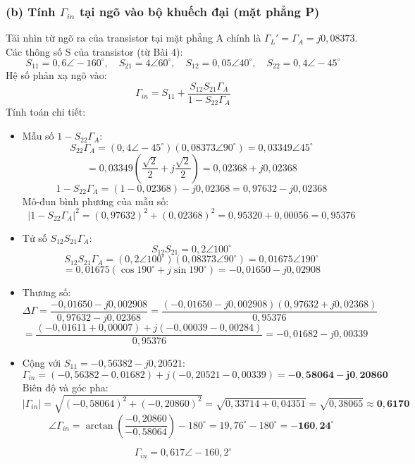\documentclass[12pt,a4paper]{article}
\begin{document}
\subsubsection{(b) Tính $\Gamma_{in}$ tại ngõ vào bộ khuếch đại (mặt phẳng P)}
Tải nhìn từ ngõ ra của transistor tại mặt phẳng A chính là $\Gamma_L' = \Gamma_A = j 0{,}08373$.
Các thông số S của transistor (từ Bài 4):
\[
S_{11} = 0{,}6\angle -160^\circ, \quad S_{21} = 4\angle 60^\circ, \quad S_{12} = 0{,}05\angle 40^\circ, \quad S_{22} = 0{,}4\angle -45^\circ
\]
Hệ số phản xạ ngõ vào:
\[
\Gamma_{in} = S_{11} + \frac{S_{12}S_{21}\Gamma_A}{1 - S_{22}\Gamma_A}
\]
Tính toán chi tiết:
\begin{itemize}
    \item Mẫu số $1 - S_{22}\Gamma_A$:
    \[
    S_{22}\Gamma_A = (0{,}4\angle -45^\circ)(0{,}08373\angle 90^\circ) = 0{,}03349 \angle 45^\circ
    \]
    \[
    = 0{,}03349\left(\frac{\sqrt{2}}{2} + j\frac{\sqrt{2}}{2}\right) = 0{,}02368 + j0{,}02368
    \]
    \[
    1 - S_{22}\Gamma_A = (1 - 0{,}02368) - j0{,}02368 = 0{,}97632 - j0{,}02368
    \]
    Mô-đun bình phương của mẫu số:
    \[
    |1 - S_{22}\Gamma_A|^2 = (0{,}97632)^2 + (0{,}02368)^2 = 0{,}95320 + 0{,}00056 = 0{,}95376
    \]
    \item Tử số $S_{12}S_{21}\Gamma_A$:
    \[
    S_{12}S_{21} = 0{,}2 \angle 100^\circ
    \]
    \[
    S_{12}S_{21}\Gamma_A = (0{,}2\angle 100^\circ)(0{,}08373\angle 90^\circ) = 0{,}01675 \angle 190^\circ
    \]
    \[
    = 0{,}01675(\cos 190^\circ + j\sin 190^\circ) = -0{,}01650 - j0{,}02908
    \]
    \item Thương số:
    \[
    \Delta \Gamma = \frac{-0{,}01650 - j0{,}002908}{0{,}97632 - j0{,}02368} = \frac{(-0{,}01650 - j0{,}002908)(0{,}97632 + j0{,}02368)}{0{,}95376}
    \]
    \[
    = \frac{(-0{,}01611 + 0{,}00007) + j(-0{,}00039 - 0{,}00284)}{0{,}95376} = -0{,}01682 - j0{,}00339
    \]
    \item Cộng với $S_{11} = -0{,}56382 - j0{,}20521$:
    \[
    \Gamma_{in} = (-0{,}56382 - 0{,}01682) + j(-0{,}20521 - 0{,}00339) = \mathbf{-0{,}58064 - j0{,}20860}
    \]
    Biên độ và góc pha:
    \[
    |\Gamma_{in}| = \sqrt{(-0{,}58064)^2 + (-0{,}20860)^2} = \sqrt{0{,}33714 + 0{,}04351} = \sqrt{0{,}38065} \approx \mathbf{0{,}6170}
    \]
    \[
    \angle \Gamma_{in} = \arctan\left(\frac{-0{,}20860}{-0{,}58064}\right) - 180^\circ = 19{,}76^\circ - 180^\circ = \mathbf{-160{,}24^\circ}
    \]
\end{itemize}
\[
\boxed{\Gamma_{in} = 0{,}617 \angle -160{,}2^\circ}
\]
\end{document}
